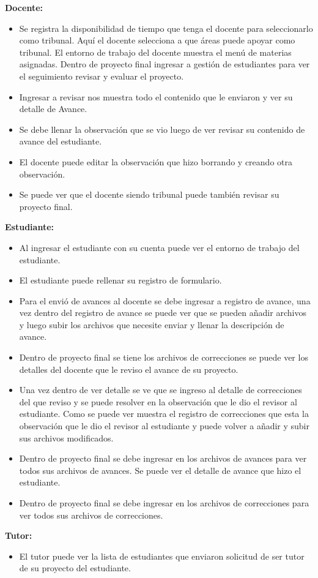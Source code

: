 \documentclass[10pt,letterpaper,twoside]{article}
\newcommand{\ctext}[1]{
    \vspace{5mm}
    {{\textcolor{titlecolor}{\large{\textbf{\textsf{#1}}}}}}
    \\
}
\begin{document}
\begin{multicols}{2}
\ctext{Docente:}
\begin{itemize}
    \item Se registra la disponibilidad de tiempo que tenga el docente para seleccionarlo como tribunal. Aquí el docente selecciona a que áreas puede apoyar como tribunal. El entorno de trabajo del docente muestra el menú de materias asignadas. Dentro de proyecto final ingresar a gestión de estudiantes para ver el seguimiento revisar y evaluar el proyecto.
    \item Ingresar a revisar nos muestra todo el contenido que le enviaron y ver su detalle de Avance.
    \item Se debe llenar la observación que se vio luego de ver revisar su contenido de avance del estudiante.
    \item El docente puede editar la observación que hizo borrando y creando otra observación.
    \item Se puede ver que el docente siendo tribunal puede también revisar su proyecto final.
\end{itemize}

\ctext{Estudiante:}
\begin{itemize}
    \item Al ingresar el estudiante con su cuenta puede ver el entorno de trabajo del estudiante.
    \item El estudiante puede rellenar su registro de formulario.
    \item Para el envió de avances al docente se debe ingresar a registro de avance, una vez dentro del registro de avance se puede ver que se pueden añadir archivos y luego subir los archivos que necesite enviar y llenar la descripción de avance.
    \item Dentro de proyecto final se tiene los archivos de correcciones se puede ver los detalles del docente que le reviso el avance de su proyecto.
    \item Una vez dentro de ver detalle se ve que se ingreso al detalle de correcciones del que reviso y se puede resolver en la observación que le dio el revisor al estudiante. Como se puede ver muestra el registro de correcciones que esta la observación que le dio el revisor al estudiante y puede volver a añadir y subir sus archivos modificados.
    \item Dentro de proyecto final se debe ingresar en los archivos de avances para ver todos sus archivos de avances. Se puede ver el detalle de avance que hizo el estudiante.
    \item Dentro de proyecto final se debe ingresar en los archivos de correcciones para ver todos sus archivos de correcciones.
\end{itemize}

\ctext{Tutor:}
\begin{itemize}
    \item El tutor puede ver la lista de estudiantes que enviaron solicitud de ser tutor de su proyecto del estudiante.
\end{itemize}
\end{multicols}
\clearpage
\end{document}
